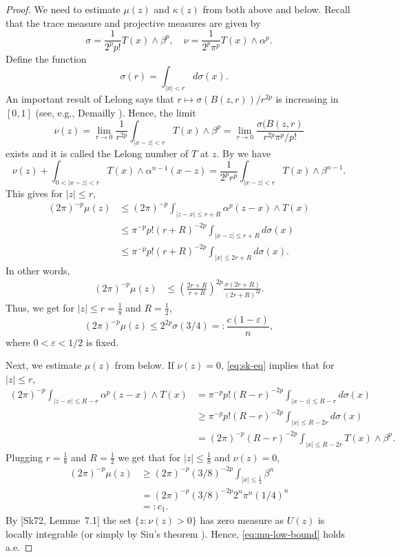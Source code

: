 \documentclass{amsart}
\newcommand{\veps}{\varepsilon}
\newcommand{\al}{\alpha}
\newcommand{\be}{\beta}
\newcommand{\sig}{\sigma}
\newcommand{\ka}{\kappa}
\theoremstyle{definition}
\numberwithin{thm}{section}
\numberwithin{equation}{section}
\renewcommand{\[}{\begin{equation}}
\renewcommand{\]}{\end{equation}}
\newcommand{\wed}{\wedge}
\begin{document}
\begin{proof}
We need to estimate $\mu(z)$ and $\ka(z)$ from both above and below. Recall that 
the trace measure and projective measures are given by
$$
	\sig = \frac{1}{2^p p! } T(x) \wed \be^{p}, \quad
	\nu = \frac{1}{2^p\pi^{p}}T(x) \wed \al^{p}.
$$
Define the function
$$
	\sig(r) = \int_{|x|<r} d\sig(x). \quad
$$
An important result of Lelong says that 
$r\mapsto \sig(B(z,r)) / r^{2p}$ is increasing in $[0, 1]$ (see, e.g., Demailly \cite[Chapter III, Consequence~5.8.]{D-book}). Hence, 
the limit
$$
	\nu(z) = \lim_{r \to 0} \frac{1}{r^{2p}} \int_{|x -z| < r}  T(x) \wed \be^p = \lim_{r\to 0} \frac{\sig( B(z,r) }{r^{2p} \pi^{p}/p!}
$$
exists and it is called the Lelong number of $T$ at $z$. By \cite[Eq. (1.17)]{Sk72} we have
\[\label{eq:sk-eq}
	\nu(z) + \int_{0< |x-z| <r} T(x) \wed \al^{n-1} (x-z) = \frac{1}{2^p r^p}\int_{|x-z|<r} T(x) \wed \be^{n-1}.
\]
This gives for $|z| \leq r$, 
$$\begin{aligned}
	(2\pi)^{-p} \mu(z) 
&\leq (2\pi)^{-p}  \int_{|z-x| \leq r+R} \al^p(z-x) \wed T (x) \\
&\leq \pi^{-p} p! (r+ R)^{-2p} \int_{|x-z| \leq r+R} d\sig(x) \\
&\leq \pi^{-p} p! (r+ R)^{-2p} \int_{|x| \leq 2r+R} d\sig(x).
\end{aligned}
$$
In other words, 
$$\begin{aligned}
	(2\pi)^{-p} \mu(z) 
&\leq  \left(\frac{2r+R}{r+R}\right)^{2p} \frac{\sig(2r +R)}{(2r+ R)^{2p}}.
\end{aligned}$$
Thus, we get for  $|z| \leq r=\frac{1}{8}$ and $R=\frac{1}{2}$,
\[\label{eq:mu-up-bound}
	(2\pi)^{-p} \mu(z) \leq 2^{2p} \sig (3/4) =: \frac{c (1-\veps)}{n},
\]
where $0<\veps<1/2$ is fixed.

Next, we estimate $\mu(z)$ from below. If $\nu (z) =0$,  \eqref{eq:sk-eq} implies that for $|z| \leq r$,
$$\begin{aligned}
	(2\pi)^{-p} \int_{|z-x| \leq R-r} \al^p(z-x) \wed T(x) 
&= \pi^{-p} p! (R-r)^{-2p} \int_{|x-z| \leq R-r} d\sig (x) \\
&\geq \pi^{-p} p! (R-r)^{-2p} \int_{|x| \leq R-2r} d\sig (x)  \\
& = (2\pi)^{-p}  (R-r)^{-2p} \int_{|x| \leq R - 2r}  T(x) \wed \be^{p}.
\end{aligned}$$
Plugging $r=\frac{1}{8}$ and $R= \frac{1}{2}$  we get that for  $|z|\leq \frac{1}{8}$ and $\nu(z) =0$,
\[\label{eq:mu-low-bound}
\begin{aligned}
	(2\pi)^{-p} \mu(z) 
&\geq (2\pi)^{-p} (3/8)^{-2p} \int_{|x| \leq \frac{1}{4}} \be^n \\
&=  (2\pi)^{-p} (3/8)^{-2p}  2^n\pi^n (1/4)^n \\
&	=:c_1.
\end{aligned}\]
By [Sk72, Lemme~7.1]  the set $\{z: \nu(z)>0\}$ has zero measure as $U(z)$ is locally integrable (or simply by Siu's theorem \cite{Siu}). Hence, \eqref{eq:mu-low-bound} holds a.e.


\end{proof}
\end{document}
